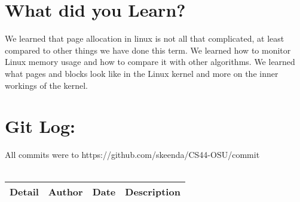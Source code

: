 \documentclass[10pt,drafclsnofoot,onecolumn]{article}
\begin{document}
\section{What did you Learn?}
We learned that page allocation in linux is not all that complicated, at least compared to other things we have done this term.
We learned how to monitor Linux memory usage and how to compare it with other algorithms.
We learned what pages and blocks look like in the Linux kernel and more on the inner workings of the kernel.

\section{Git Log:}
All commits were to https://github.com/skeenda/CS44-OSU/commit\\
\\
\begin{tabular}{|p{1.5cm}|p{2cm}|p{5cm}|p{7cm}|}
\textbf{Detail} & \textbf{Author} & \textbf{Date} & \textbf{Description}\\\hline

\end{tabular}



\end{document}
